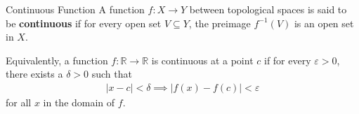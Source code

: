 \documentclass[10pt]{article}
\begin{document}
\begin{definition}{Continuous Function}
    A function $f: X \rightarrow Y$ between topological spaces is said to be \textbf{continuous} if for every open set $V \subseteq Y$, the preimage $f^{-1}(V)$ is an open set in $X$.

    Equivalently, a function $f: \mathbb{R} \rightarrow \mathbb{R}$ is continuous at a point $c$ if for every $\varepsilon > 0$, there exists a $\delta > 0$ such that
    \begin{align}
        |x - c| < \delta \implies |f(x) - f(c)| < \varepsilon
    \end{align}
    for all $x$ in the domain of $f$.
\end{definition}
\end{document}
